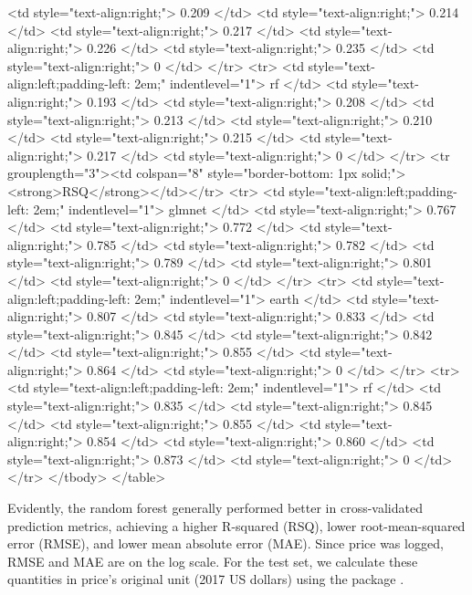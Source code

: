 \begin{Schunk}
   <td style="text-align:right;"> 0.209 </td>
   <td style="text-align:right;"> 0.214 </td>
   <td style="text-align:right;"> 0.217 </td>
   <td style="text-align:right;"> 0.226 </td>
   <td style="text-align:right;"> 0.235 </td>
   <td style="text-align:right;"> 0 </td>
  </tr>
  <tr>
   <td style="text-align:left;padding-left: 2em;" indentlevel="1"> rf </td>
   <td style="text-align:right;"> 0.193 </td>
   <td style="text-align:right;"> 0.208 </td>
   <td style="text-align:right;"> 0.213 </td>
   <td style="text-align:right;"> 0.210 </td>
   <td style="text-align:right;"> 0.215 </td>
   <td style="text-align:right;"> 0.217 </td>
   <td style="text-align:right;"> 0 </td>
  </tr>
  <tr grouplength="3"><td colspan="8" style="border-bottom: 1px solid;"><strong>RSQ</strong></td></tr>
<tr>
   <td style="text-align:left;padding-left: 2em;" indentlevel="1"> glmnet </td>
   <td style="text-align:right;"> 0.767 </td>
   <td style="text-align:right;"> 0.772 </td>
   <td style="text-align:right;"> 0.785 </td>
   <td style="text-align:right;"> 0.782 </td>
   <td style="text-align:right;"> 0.789 </td>
   <td style="text-align:right;"> 0.801 </td>
   <td style="text-align:right;"> 0 </td>
  </tr>
  <tr>
   <td style="text-align:left;padding-left: 2em;" indentlevel="1"> earth </td>
   <td style="text-align:right;"> 0.807 </td>
   <td style="text-align:right;"> 0.833 </td>
   <td style="text-align:right;"> 0.845 </td>
   <td style="text-align:right;"> 0.842 </td>
   <td style="text-align:right;"> 0.855 </td>
   <td style="text-align:right;"> 0.864 </td>
   <td style="text-align:right;"> 0 </td>
  </tr>
  <tr>
   <td style="text-align:left;padding-left: 2em;" indentlevel="1"> rf </td>
   <td style="text-align:right;"> 0.835 </td>
   <td style="text-align:right;"> 0.845 </td>
   <td style="text-align:right;"> 0.855 </td>
   <td style="text-align:right;"> 0.854 </td>
   <td style="text-align:right;"> 0.860 </td>
   <td style="text-align:right;"> 0.873 </td>
   <td style="text-align:right;"> 0 </td>
  </tr>
</tbody>
</table>

\end{Schunk}

Evidently, the random forest generally performed better in
cross-validated prediction metrics, achieving a higher R-squared (RSQ),
lower root-mean-squared error (RMSE), and lower mean absolute error
(MAE). Since price was logged, RMSE and MAE are on the log scale. For
the test set, we calculate these quantities in price's original unit
(2017 US dollars) using the  package
\citep{yardstick}.

